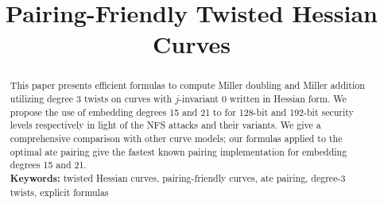 \documentclass[11pt,runningheads]{llncs}
\theoremstyle{definition}
\newif\ifpublic
\begin{document}
\title{Pairing-Friendly Twisted Hessian Curves}


\ifpublic
\author{
Chitchanok Chuengsatiansup\inst{1}
\and
Chloe Martindale\inst{2}
}
\authorrunning{Chuengsatiansup, Martindale}

\institute{
INRIA and ENS de Lyon\\
46 All\'{e}e d'Italie 69364 Lyon Cedex 07, France \\
\email{chitchanok.chuengsatiansup@ens-lyon.fr}
\and
Department of Mathematics and Computer Science\\
Technische Universiteit Eindhoven\\
P.O. Box 513, 5600 MB Eindhoven, The Netherlands\\
\email{c.r.martindale@tue.nl}
}
\fi


\date{}
\maketitle
\begin{abstract}
This paper presents efficient formulas to compute Miller doubling and Miller addition utilizing degree 3 twists on curves with $j$-invariant 0 written in Hessian form. 
We propose the use of embedding degrees 15 and 21 to for 128-bit and 192-bit security levels respectively in light of the NFS attacks and their variants.
We give a comprehensive comparison with other curve models; our formulas 
applied to the optimal ate pairing give the fastest known pairing implementation
for embedding degrees 15 and 21.
\\[10pt]
\textbf{Keywords:}
twisted Hessian curves, pairing-friendly curves, ate pairing, degree-3 twists, explicit formulas
\end{abstract}

\ifpublic
\begingroup
\makeatletter
\def\@thefnmark{} \@footnotetext{\relax
Chitchanok Chuengsatiansup acknowledges the support of Bpifrance
in the context of the national projet RISQ (P141580).
Chloe Martindale was supported by the Commission
of the European Communities through the Horizon 2020 program under
CHIST-ERA USEIT (NWO project 651.002.004).
}
\endgroup
\fi






%



%
%
%


%






%
%
%
\end{document}
